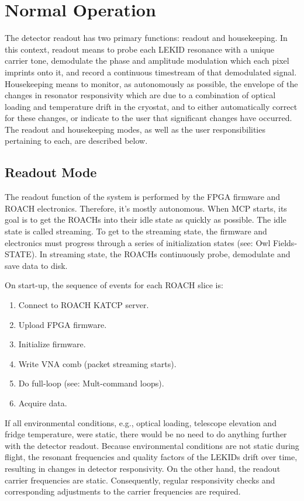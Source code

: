\section{Normal Operation}\label{normal_mode}
The detector readout has two primary functions: readout and housekeeping. In this context, readout means to probe each LEKID resonance with a unique carrier tone, demodulate the phase and amplitude modulation which each pixel imprints onto it, and record a continuous timestream of that demodulated signal. Housekeeping means to monitor, as autonomously as possible, the envelope of the changes in resonator responsivity which are due to a combination of optical loading and temperature drift in the cryostat, and to either automatically correct for these changes, or indicate to the user that significant changes have occurred. The readout and housekeeping modes, as well as the user responsibilities pertaining to each, are described below.

\subsection{Readout Mode}
The readout function of the system is performed by the FPGA firmware and ROACH electronics. Therefore, it’s mostly autonomous. When MCP starts, its goal is to get the ROACHs into their idle state as quickly as possible. The idle state is called streaming. To get to the streaming state, the firmware and electronics must progress through a series of initialization states (see: Owl Fields-STATE). In streaming state, the ROACHs continuously probe, demodulate and save data to disk.

On start-up, the sequence of events for each ROACH slice is:
\begin{enumerate}
 \item  Connect to ROACH KATCP server.
 \item  Upload FPGA firmware.
 \item  Initialize firmware.
 \item  Write VNA comb (packet streaming starts).
 \item  Do full-loop (see: Mult-command loops).
 \item  Acquire data.
\end{enumerate}

If all environmental conditions, e.g., optical loading, telescope elevation and fridge temperature, were static, there would be no need to do anything further with the detector readout. Because environmental conditions are not static during flight, the resonant frequencies and quality factors of the LEKIDs drift over time, resulting in changes in detector responsivity. On the other hand, the readout carrier frequencies are static. Consequently, regular responsivity checks and corresponding adjustments to the carrier frequencies are required.


